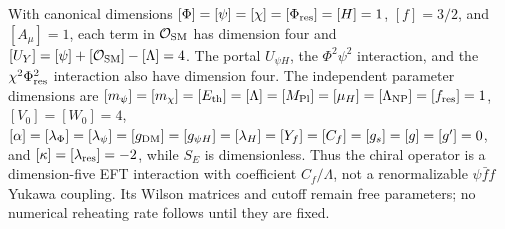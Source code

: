 \documentclass[epj]{svjour}
\begin{document}
With canonical
dimensions \([\Phi]=[\psi]=[\chi]=[\Phi_{\rm res}]=[H]=1\),
\([f]=3/2\), and \([A_\mu]=1\), each term in
\(\mathcal O_{\rm SM}\) has dimension four and
\([U_Y]=[\psi]+[\mathcal O_{\rm SM}]-[\Lambda]=4\).
The portal \(U_{\psi H}\), the \(\Phi^2\psi^2\) interaction,
and the \(\chi^2\Phi_{\rm res}^2\) interaction also have dimension
four. The independent parameter dimensions are
\([m_\psi]=[m_\chi]=[E_{\rm th}]=[\Lambda]=[M_{\rm Pl}]
=[\mu_H]=[\Lambda_{\rm NP}]=[f_{\rm res}]=1\),
\([V_0]=[W_0]=4\),
\([\alpha]=[\lambda_\Phi]=[\lambda_\psi]=[g_{\rm DM}]
=[g_{\psi H}]=[\lambda_H]=[Y_f]=[C_f]=[g_s]=[g]=[g']=0\), and
\([\kappa]=[\lambda_{\rm res}]=-2\), while \(S_E\) is dimensionless.
Thus the chiral operator is a dimension-five EFT interaction with
coefficient \(C_f/\Lambda\), not a renormalizable
\(\psi\bar f f\) Yukawa coupling. Its Wilson matrices and cutoff
remain free parameters; no numerical reheating rate follows until
they are fixed.
\end{document}
